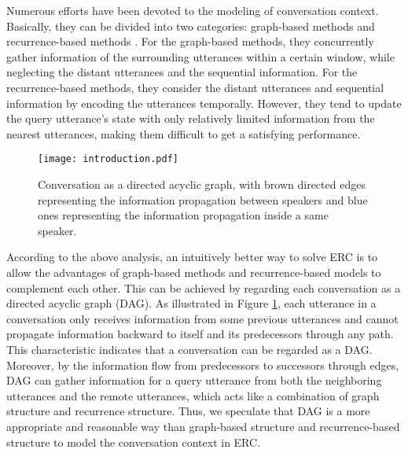 \documentclass[11pt,a4paper]{article}
\begin{document}
Numerous efforts have been devoted to the modeling of conversation context. Basically, they can be divided into two categories: graph-based methods \citep{zhang2019modeling, ghosal2019dialoguegcn,zhong2019knowledge,ishiwatari2020relation,shen2020dialogxl} and recurrence-based methods \citep{hazarika2018icon, hazarika2018conversational, majumder2019dialoguernn, ghosal2020cosmic}. 
For the graph-based methods, they concurrently gather information of the surrounding utterances within a certain window, while neglecting the distant utterances and the sequential information. For the recurrence-based methods, they consider the distant utterances and sequential information by encoding the utterances temporally. However, they tend to update the query utterance's state with only relatively limited information from the nearest utterances, making them difficult to get a satisfying performance.



\begin{figure}[t]
	\centering
	\texttt{[image: introduction.pdf]} \caption{Conversation as a directed acyclic graph, with brown directed edges representing  the information propagation between speakers and blue ones representing the information propagation inside a same speaker.}
	\label{fig:introduction}
	\vspace{-0.4cm}
\end{figure} 

According to the above analysis, an intuitively better way to solve ERC is to allow the advantages of graph-based methods and recurrence-based models to complement each other. This can be achieved by regarding each conversation as a directed acyclic graph (DAG).
As illustrated in Figure \ref{fig:introduction}, each utterance in a conversation only receives information from some previous utterances and cannot propagate information backward to itself and its predecessors through any path. 
This characteristic indicates that a conversation can be regarded as a DAG. 
Moreover, by the information flow from predecessors to successors through edges, DAG can gather information for a query utterance from both the neighboring utterances and the remote utterances, which acts like a combination of graph structure and recurrence structure. Thus, we speculate that DAG is a more appropriate and reasonable way than graph-based structure and recurrence-based structure to model the conversation context in ERC.
\end{document}
